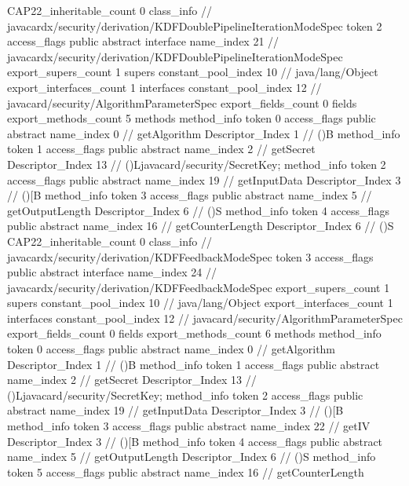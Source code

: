 {{{{{				}
			}
			CAP22_inheritable_count	0
		}
		class_info {		// javacardx/security/derivation/KDFDoublePipelineIterationModeSpec
			token	2
			access_flags	public abstract interface
			name_index	21		// javacardx/security/derivation/KDFDoublePipelineIterationModeSpec
			export_supers_count	1
			supers {
				constant_pool_index	10		// java/lang/Object
			}
			export_interfaces_count	1
			interfaces {
				constant_pool_index	12		// javacard/security/AlgorithmParameterSpec
			}
			export_fields_count	0
			fields {
			}
			export_methods_count	5
			methods {
				method_info {
					token	0
					access_flags	public abstract
					name_index	0		// getAlgorithm
					Descriptor_Index	1		// ()B
				}
				method_info {
					token	1
					access_flags	public abstract
					name_index	2		// getSecret
					Descriptor_Index	13		// ()Ljavacard/security/SecretKey;
				}
				method_info {
					token	2
					access_flags	public abstract
					name_index	19		// getInputData
					Descriptor_Index	3		// ()[B
				}
				method_info {
					token	3
					access_flags	public abstract
					name_index	5		// getOutputLength
					Descriptor_Index	6		// ()S
				}
				method_info {
					token	4
					access_flags	public abstract
					name_index	16		// getCounterLength
					Descriptor_Index	6		// ()S
				}
			}
			CAP22_inheritable_count	0
		}
		class_info {		// javacardx/security/derivation/KDFFeedbackModeSpec
			token	3
			access_flags	public abstract interface
			name_index	24		// javacardx/security/derivation/KDFFeedbackModeSpec
			export_supers_count	1
			supers {
				constant_pool_index	10		// java/lang/Object
			}
			export_interfaces_count	1
			interfaces {
				constant_pool_index	12		// javacard/security/AlgorithmParameterSpec
			}
			export_fields_count	0
			fields {
			}
			export_methods_count	6
			methods {
				method_info {
					token	0
					access_flags	public abstract
					name_index	0		// getAlgorithm
					Descriptor_Index	1		// ()B
				}
				method_info {
					token	1
					access_flags	public abstract
					name_index	2		// getSecret
					Descriptor_Index	13		// ()Ljavacard/security/SecretKey;
				}
				method_info {
					token	2
					access_flags	public abstract
					name_index	19		// getInputData
					Descriptor_Index	3		// ()[B
				}
				method_info {
					token	3
					access_flags	public abstract
					name_index	22		// getIV
					Descriptor_Index	3		// ()[B
				}
				method_info {
					token	4
					access_flags	public abstract
					name_index	5		// getOutputLength
					Descriptor_Index	6		// ()S
				}
				method_info {
					token	5
					access_flags	public abstract
					name_index	16		// getCounterLength
}}}}}
